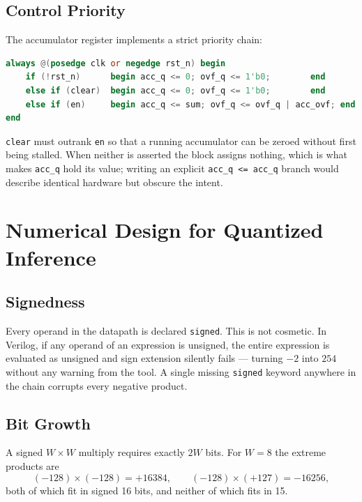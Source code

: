 \documentclass[letterpaper,12pt]{article}
\begin{document}
\subsection{Control Priority}

The accumulator register implements a strict priority chain:

\begin{lstlisting}[language=Verilog]
always @(posedge clk or negedge rst_n) begin
    if (!rst_n)      begin acc_q <= 0; ovf_q <= 1'b0;        end
    else if (clear)  begin acc_q <= 0; ovf_q <= 1'b0;        end
    else if (en)     begin acc_q <= sum; ovf_q <= ovf_q | acc_ovf; end
end
\end{lstlisting}

\texttt{clear} must outrank \texttt{en} so that a running accumulator can be
zeroed without first being stalled. When neither is asserted the block assigns
nothing, which is what makes \texttt{acc\_q} hold its value; writing an
explicit \texttt{acc\_q <= acc\_q} branch would describe identical hardware but
obscure the intent.

\section{Numerical Design for Quantized Inference}

\subsection{Signedness}

Every operand in the datapath is declared \texttt{signed}. This is not
cosmetic. In Verilog, if any operand of an expression is unsigned, the entire
expression is evaluated as unsigned and sign extension silently fails ---
turning $-2$ into $254$ without any warning from the tool. A single missing
\texttt{signed} keyword anywhere in the chain corrupts every negative product.

\subsection{Bit Growth}

A signed $W\times W$ multiply requires exactly $2W$ bits. For $W = 8$ the
extreme products are
\[
(-128)\times(-128) = +16384, \qquad (-128)\times(+127) = -16256,
\]
both of which fit in signed 16 bits, and neither of which fits in 15.
\end{document}
